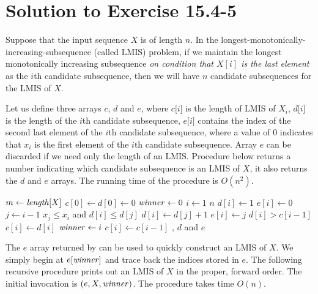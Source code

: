 \documentclass[a4paper, fleqn]{article}
\begin{document}
\section*{Solution to Exercise 15.4-5}

Suppose that the input sequence $X$ is of length $n$. In the
longest-monotonically-increasing-subsequence (called LMIS) problem, if
we maintain the longest monotonically increasing subsequence
\textit{on condition that $X[i]$ is the last element} as the $i$th
candidate subsequence, then we will have $n$ candidate subsequences
for the LMIS of $X$.

Let us define three arrays $c$, $d$ and $e$, where $c \lbrack i
\rbrack$ is the length of LMIS of $X_i$, $d \lbrack i \rbrack$ is the
length of the $i$th candidate subsequence, $e \lbrack i \rbrack$
contains the index of the second last element of the $i$th candidate
subsequence, where a value of 0 indicates that $x_i$ is the first
element of the $i$th candidate subsequence. Array $e$ can be discarded
if we need only the length of an LMIS. Procedure 
below returns a number indicating which candidate subsequence is an
LMIS of $X$, it also returns the $d$ and $e$ arrays.  The running time
of the procedure is $O(n^2)$.

\begin{codebox}
\li $m \gets \id{length}[X]$
\li $c[0] \gets d[0] \gets 0$
\li $\id{winner} \gets 0$
\li \For $i \gets 1$ \To $n$           \label{lmis-len-outer-for-begin}
\li   \Do                          
        $d[i] \gets 1$
\li     $e[i] \gets 0$
\li     \For $j \gets i-1$ 
\li       \Do
            \If $x_j \leq x_i$ and $d[i] \leq d[j]$
\li           \Then
                $d[i] \gets d[j] + 1$
\li             $e[i] \gets j$
              \End
          \End                     
\li     \If $d[i] > c[i-1]$
\li       \Then $c[i] \gets d[i]$
\li             $\id{winner} \gets i$
\li       \Else $c[i] \gets c[i-1]$
          \End
      \End                             \label{lmis-len-outer-for-end}
\li \Return {}, $d$ and $e$
\end{codebox}

The $e$ array returned by  can be used to quickly
construct an LMIS of $X$. We simply begin at $e[\id{winner}]$ and
trace back the indices stored in $e$. The following recursive
procedure prints out an LMIS of $X$ in the proper, forward order. The
initial invocation is $(e, X, \id{winner})$. The
procedure takes time $O(n)$.
\end{document}
